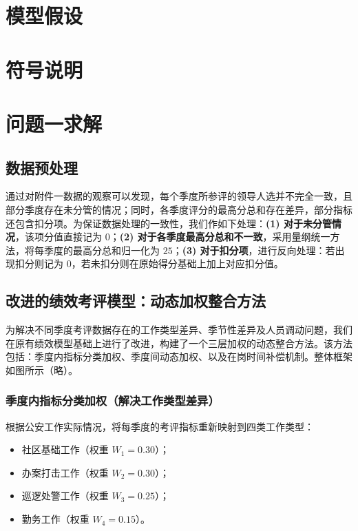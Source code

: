 \documentclass[12pt]{ctexart}
\begin{document}
	\section{模型假设}
	
	\section{符号说明}
	
	\section{问题一求解}
	\subsection{数据预处理}

	通过对附件一数据的观察可以发现，每个季度所参评的领导人选并不完全一致，且部分季度存在未分管的情况；同时，各季度评分的最高分总和存在差异，部分指标还包含扣分项。为保证数据处理的一致性，我们作如下处理：\textbf{(1) 对于未分管情况}，该项分值直接记为 $0$；\textbf{(2) 对于各季度最高分总和不一致}，采用量纲统一方法，将每季度的最高分总和归一化为 $25$；\textbf{(3) 对于扣分项}，进行反向处理：若出现扣分则记为 $0$，若未扣分则在原始得分基础上加上对应扣分值。
	
	\subsection{改进的绩效考评模型：动态加权整合方法}
	
	为解决不同季度考评数据存在的工作类型差异、季节性差异及人员调动问题，我们在原有绩效模型基础上进行了改进，构建了一个三层加权的动态整合方法。该方法包括：季度内指标分类加权、季度间动态加权、以及在岗时间补偿机制。整体框架如图所示（略）。
	
	\subsubsection{季度内指标分类加权（解决工作类型差异）}
	
	根据公安工作实际情况，将每季度的考评指标重新映射到四类工作类型：
	\begin{itemize}
		\item 社区基础工作（权重 $W_1=0.30$）；
		\item 办案打击工作（权重 $W_2=0.30$）；
		\item 巡逻处警工作（权重 $W_3=0.25$）；
		\item 勤务工作（权重 $W_4=0.15$）。
	\end{itemize}
	
\end{document}
